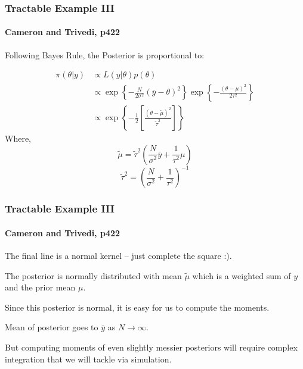 \documentclass[11pt, aspectratio=169]{beamer}
\newenvironment{wideitemize}{\itemize\addtolength{\itemsep}{10pt}}{\enditemize}
\begin{document}
\begin{frame}[t]\frametitle{Tractable Example III}
\framesubtitle{Cameron and Trivedi, p422}    

Following Bayes Rule, the Posterior is proportional to:

\begin{align*}
\pi(\theta | y) & \propto L(y|\theta) p(\theta) \\
& \propto \exp  \left\{ - \frac{N}{2 \sigma^2}   (\bar{y} - \theta)^2 \right\} \exp \left\{ - \frac{(\theta - \mu)^2}{2 \tau^2} \right\} \\
& \propto  \exp \left\{ - \frac{1}{2} \left[ \frac{ (\theta - \tilde{\mu})^2 }{\tilde{\tau}^2} \right] \right\}
\end{align*} 
Where,  
$$\tilde{\mu} = \tilde{\tau}^2 \left( \frac{N}{\sigma^2} \bar{y} + \frac{1}{\tau^2} \mu \right)$$
$$\tilde{\tau}^2 = \left(  \frac{N}{\sigma^2} + \frac{1}{\tau^2} \right)^{-1} $$


\end{frame}


\begin{frame}[c]\frametitle{Tractable Example III}
\framesubtitle{Cameron and Trivedi, p422}    

\begin{wideitemize}
	\item The final line is a normal kernel -- just complete the square :). 
	\item The posterior is normally distributed with mean $\tilde{\mu}$ which is a weighted sum of $y$ and the prior mean $\mu$.
	\item Since this posterior is normal, it is easy for us to compute the moments.
	\item Mean of posterior goes to $\bar{y}$ as $N\rightarrow\infty$. 
	\item But computing moments of even slightly messier posteriors will require complex integration that we will tackle via simulation. 
\end{wideitemize}

\end{frame}
\end{document}
